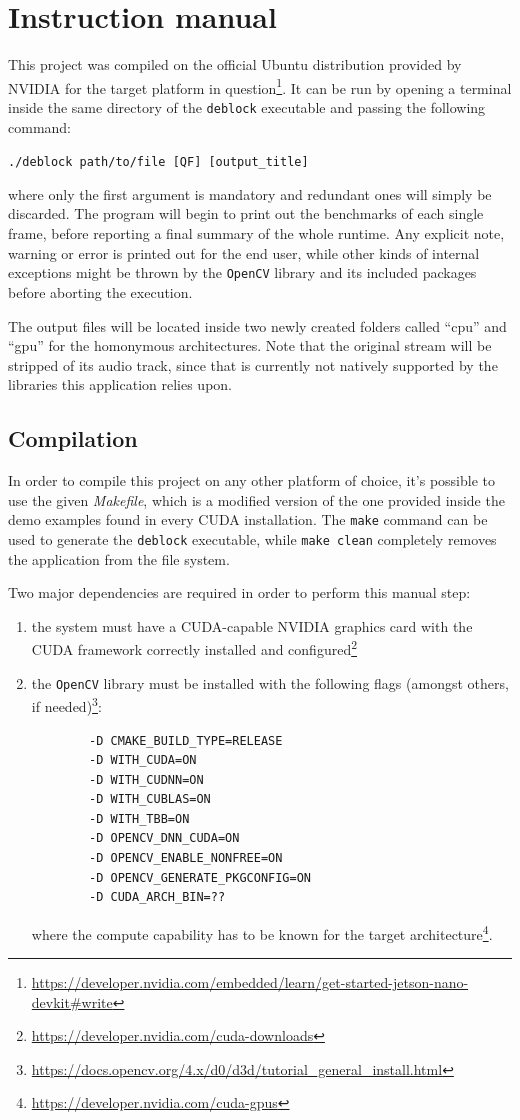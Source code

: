 \documentclass{article}
\begin{document}
\section{Instruction manual}
This project was compiled on the official Ubuntu distribution provided by NVIDIA for the target platform in question\footnote{\url{https://developer.nvidia.com/embedded/learn/get-started-jetson-nano-devkit\#write}}. It can be run by opening a terminal inside the same directory of the \texttt{deblock} executable and passing the following command:
\begin{center}
    \texttt{./deblock path/to/file [QF] [output\_title]}
\end{center}
where only the first argument is mandatory and redundant ones will simply be discarded. The program will begin to print out the benchmarks of each single frame, before reporting a final summary of the whole runtime. Any explicit note, warning or error is printed out for the end user, while other kinds of internal exceptions might be thrown by the \texttt{OpenCV} library and its included packages before aborting the execution.

The output files will be located inside two newly created folders called ``cpu'' and ``gpu'' for the homonymous architectures. Note that the original stream will be stripped of its audio track, since that is currently not natively supported by the libraries this application relies upon.

\subsection{Compilation}
In order to compile this project on any other platform of choice, it's possible to use the given \textit{Makefile}, which is a modified version of the one provided inside the demo examples found in every CUDA installation. The \texttt{make} command can be used to generate the \texttt{deblock} executable, while \texttt{make clean} completely removes the application from the file system.

Two major dependencies are required in order to perform this manual step:
\begin{enumerate}
    \item the system must have a CUDA-capable NVIDIA graphics card with the CUDA framework correctly installed and configured\footnote{\url{https://developer.nvidia.com/cuda-downloads}}
    \item the \texttt{OpenCV} library must be installed with the following flags (amongst others, if needed)\footnote{\url{https://docs.opencv.org/4.x/d0/d3d/tutorial_general_install.html}}:
        \begin{verbatim}
        -D CMAKE_BUILD_TYPE=RELEASE
        -D WITH_CUDA=ON
        -D WITH_CUDNN=ON
        -D WITH_CUBLAS=ON
        -D WITH_TBB=ON
        -D OPENCV_DNN_CUDA=ON
        -D OPENCV_ENABLE_NONFREE=ON
        -D OPENCV_GENERATE_PKGCONFIG=ON
        -D CUDA_ARCH_BIN=??
        \end{verbatim}
    where the compute capability has to be known for the target architecture\footnote{\url{https://developer.nvidia.com/cuda-gpus}}.
\end{enumerate}
\end{document}
